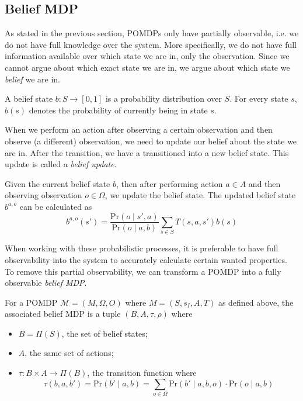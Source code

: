 \subsection*{Belief MDP}
As stated in the previous section, POMDPs only have partially observable, i.e. we do not have full knowledge over the system. More specifically, we do not have full information available over which state we are in, only the observation. Since we cannot argue about which exact state we are in, we argue about which state we \textit{belief} we are in. 

\begin{definition}
A belief state $b:S\to [0,1]$ is a probability distribution over $S$. For every state $s$, $b(s)$ denotes the probability of currently being in state $s$.
\end{definition}

When we perform an action after observing a certain observation and then observe (a different) observation, we need to update our belief about the state we are in.  After the transition, we have a transitioned into a new belief state. This update is called a \textit{belief update}. 

\begin{definition}
Given the current belief state $b$, then after performing action $a\in A$ and then observing observation $o\in\Omega$, we update the belief state. The updated belief state $b^{a,o}$ can be calculated as
\[b^{a,o}(s')= \frac{\text{Pr}(o\mid s',a)}{\text{Pr}(o\mid a,b)}\sum\limits_{s\in S}T(s,a,s')b(s)\]
\end{definition}

When working with these probabilistic processes, it is preferable to have full observability into the system to accurately calculate certain wanted properties. To remove this partial observability, we can transform a POMDP into a fully observable \textit{belief MDP}. 

\begin{definition}
For a POMDP $\mathcal{M}=(M,\Omega,O)$ where $M=(S,s_I,A,T)$ as defined above, the associated belief MDP is a tuple $(B,A,\tau,\rho)$ where 
\begin{itemize}
\item $B=\Pi(S)$, the set of belief states;
\item $A$, the same set of actions;
\item $\tau:B\times A\to \Pi(B)$, the transition function where 
\[\tau(b,a,b')= \text{Pr}(b'\mid a,b)=\sum\limits_{o\in\Omega}\text{Pr}(b'\mid a,b,o)\cdot \text{Pr}(o\mid a,b)\]
\end{itemize}
\end{definition}

